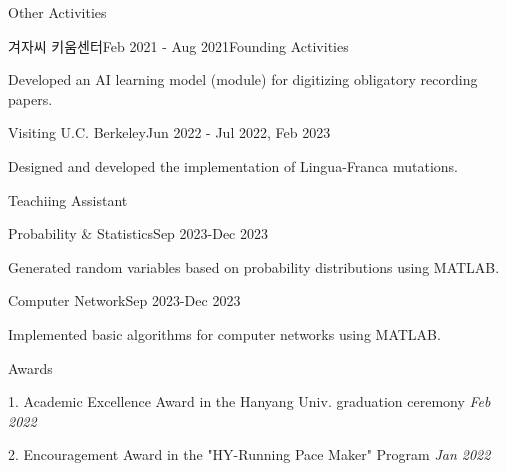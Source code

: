 \documentclass[
	11pt, %
]{resume} %
\begin{document}
	



\begin{rSection}{Other Activities}

	\begin{rSubsection}{겨자씨 키움센터}{Feb 2021 - Aug 2021}{Founding Activities}{}
		\item Developed an AI learning model (module) for digitizing obligatory recording papers.
	\end{rSubsection}

	\begin{rSubsection}{Visiting U.C. Berkeley}{Jun 2022 - Jul 2022, Feb 2023}{}{}
		\item Designed and developed the implementation of Lingua-Franca mutations.
	\end{rSubsection}

\end{rSection}

\begin{rSection}{Teachiing Assistant}

	\begin{rSubsection}{Probability \& Statistics}{Sep 2023-Dec 2023}{}{}
		\item Generated random variables based on probability distributions using MATLAB.
	\end{rSubsection}

	\begin{rSubsection}{Computer Network}{Sep 2023-Dec 2023}{}{}
		\item Implemented basic algorithms for computer networks using MATLAB.
	\end{rSubsection}

\end{rSection}

\begin{rSection}{Awards}

	1. Academic Excellence Award in the Hanyang Univ. graduation ceremony \hfill \textit {Feb 2022}

	2. Encouragement Award in the "HY-Running Pace Maker" Program \hfill \textit {Jan 2022}

\end{rSection}

\end{document}
